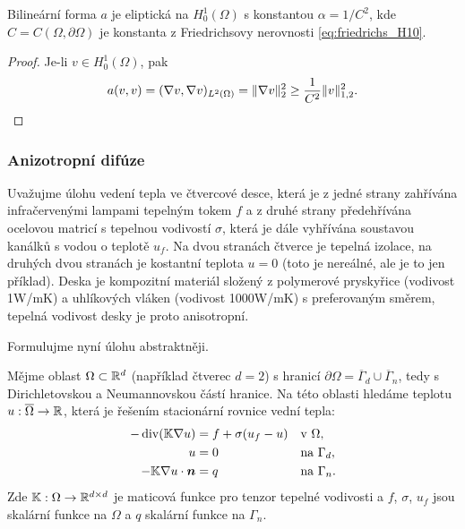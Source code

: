 \begin{veta}
    Bilineární forma $a$ je eliptická na $H^1_0(\Omega)$ s konstantou $\alpha=1/C^2$, 
    kde $C=C(\Omega,\partial\Omega)$ je konstanta z Friedrichsovy nerovnosti \eqref{eq:friedrichs_H10}.
\end{veta}
\begin{proof}
    Je-li $v\in H^1_0(\Omega)$, pak
    \[ 
        a(v,v) = (\nabla v,\nabla v)_{L^2(\Omega)} 
               = \|\nabla v\|_2^2 \ge \frac1{C^2}\|v\|_{1,2}^2. 
    \]
\end{proof}






\subsubsection{Anizotropní difúze}
Uvažujme úlohu vedení tepla ve čtvercové desce, která je z jedné strany zahřívána infračervenými lampami 
tepelným tokem $f$ a z druhé strany předehřívána ocelovou matricí s tepelnou vodivostí $\sigma$, která je dále 
vyhřívána soustavou kanálků s vodou o teplotě $u_f$. Na dvou stranách čtverce je tepelná izolace, na druhých dvou stranách je 
kostantní teplota $u=0$ (toto je nereálné, ale je to jen příklad). Deska je kompozitní materiál složený z polymerové pryskyřice 
(vodivost 1W/mK) a uhlíkových vláken (vodivost 1000W/mK) s preferovaným směrem, tepelná vodivost desky je proto anisotropní.

Formulujme nyní úlohu abstraktněji.

Mějme oblast $\Omega\subset\mathbb R^d$ (například čtverec $d=2$) s hranicí 
$\partial\Omega=\overline\Gamma_d\cup\overline\Gamma_n$, tedy s Dirichletovskou a Neumannovskou částí hranice.
Na této oblasti hledáme teplotu $u:\overline\Omega\rightarrow\mathbb R$, která je řešením stacionární rovnice vední tepla:
\begin{align}
    -\operatorname{div}({\mathbb{K}}\nabla u) &= f + \sigma(u_f - u) &&\text{v }\Omega,\\
    u&=0 && \text{na }\Gamma_d,\\
    -{\mathbb{K}} \nabla u \cdot \mathbf{\boldsymbol{n}} &= q &&\text{na }\Gamma_n.
\end{align} 
Zde ${\mathbb{K}}:\Omega\rightarrow\mathbb R^{d\times d}$ je maticová funkce pro tenzor tepelné vodivosti
a $f$, $\sigma$, $u_f$ jsou skalární funkce na $\Omega$  a $q$ skalární funkce na $\Gamma_n$.

